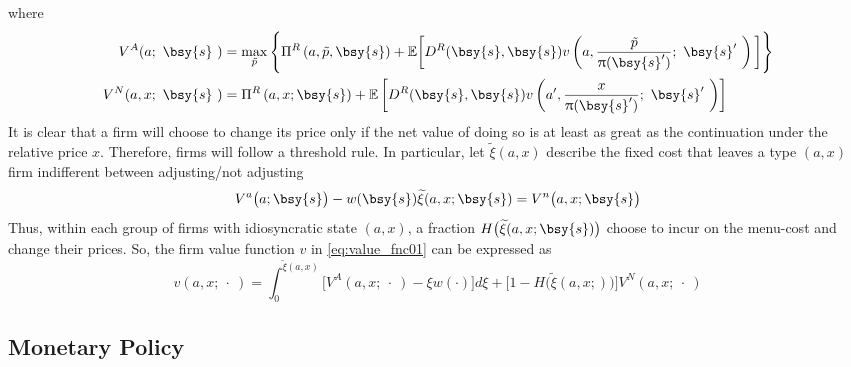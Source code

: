 \documentclass[a4paper,10pt]{article}  %
\begin{document}
\begin{itemize}[label=\raisebox{0.50ex}{\tiny$\bullet$}]
\begin{equation}
   \end{equation}
   where
   \begin{align}
      \label{eq:value_fnc02}
      V^A(a; \ \bsy{s} \ ) & = \max_{\tilde{p}} 
         \Bigg\{ 
            \Pi^R \left( a, \tilde{p}, \bsy{s} \right) + 
            \mathbb{E} \bigg[ D^R(\bsy{s},\bsy{s}) v\left( a, \frac{ \tilde{p} }{ \uppi(\bsy{s}') } ; \ \bsy{s}' \ \right) \bigg]
         \Bigg\} \\
      \label{eq:value_fnc03}
      V^N(a, x; \ \bsy{s} \ ) & = 
          \Pi^R \left( a, x; \bsy{s} \right) + \mathbb{E}
          \left[ 
               D^R(\bsy{s},\bsy{s}) v\left( a', \frac{x}{ \uppi(\bsy{s}') } ; \ \bsy{s}' \  \right)
          \right]
   \end{align}
   It is clear that a firm will choose to change its price only if the net value of doing so is at least as great as the
   continuation under the relative price $ x $. Therefore, firms will follow a threshold rule. In particular, let 
   $ \widetilde{\xi} (a,x) $ describe the fixed cost that leaves a type $ (a,x ) $ firm indifferent between
   adjusting/not adjusting
   \begin{equation}
      \label{eq:threshold_policy}
      V^a\big( a ; \bsy{s} \big) - w(\bsy{s})\widetilde{\xi}(a,x; \bsy{s} ) =  V^n\big( a,x; \bsy{s} \big)
   \end{equation}
   Thus, within each group of firms with idiosyncratic state $ (a,x) $, a fraction $ H\big( \widetilde{\xi}(a,x; \bsy{s}
   ) \big) $ choose to incur on the menu-cost and change their prices. So, the firm value function $v$ in
   \eqref{eq:value_fnc01} can be expressed as
   \begin{equation}
      v(a, x; \ \cdot \ ) = 
         \int_0^{ \tilde{\xi}(a,x ) } 
         \Big[ 
            V^A(a, x ; \ \cdot \ ) - \xi w(\cdot) 
         \Big]d\xi  
         + \Big[  1 - H\Big( \tilde{\xi}(a, x ; ) \Big) \Big] V^N(a,x ; \ \cdot \ )
   \end{equation}
\end{itemize}



\subsection{Monetary Policy} %
\label{sub:monetary_policy}
\end{document}
